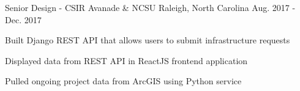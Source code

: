 \begin{cventries}
	
	\cventry
		{Senior Design - CSIR} %
		{Avanade \& NCSU} %
		{Raleigh, North Carolina} %
		{Aug. 2017 - Dec. 2017} %
	{
		\begin{cvitems} %
			\item {Built Django REST API that allows users to submit infrastructure requests}
			\item {Displayed data from REST API in ReactJS frontend application}
			\item {Pulled ongoing project data from ArcGIS using Python service}
		\end{cvitems}
	}
	



\end{cventries}
